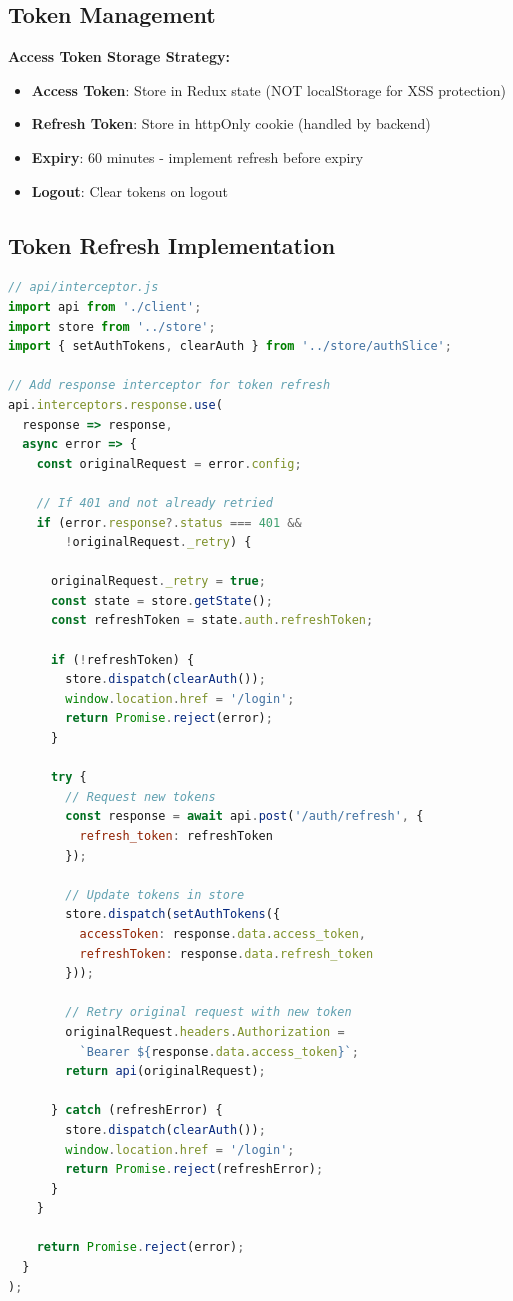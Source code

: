 \documentclass[12pt,a4paper,oneside]{article}
\begin{document}
\subsection{Token Management}

\textbf{Access Token Storage Strategy:}

\begin{itemize}
    \item \textbf{Access Token}: Store in Redux state (NOT localStorage for XSS protection)
    \item \textbf{Refresh Token}: Store in httpOnly cookie (handled by backend)
    \item \textbf{Expiry}: 60 minutes - implement refresh before expiry
    \item \textbf{Logout}: Clear tokens on logout
\end{itemize}

\subsection{Token Refresh Implementation}

\begin{lstlisting}[language=javascript]
// api/interceptor.js
import api from './client';
import store from '../store';
import { setAuthTokens, clearAuth } from '../store/authSlice';

// Add response interceptor for token refresh
api.interceptors.response.use(
  response => response,
  async error => {
    const originalRequest = error.config;

    // If 401 and not already retried
    if (error.response?.status === 401 && 
        !originalRequest._retry) {
      
      originalRequest._retry = true;
      const state = store.getState();
      const refreshToken = state.auth.refreshToken;

      if (!refreshToken) {
        store.dispatch(clearAuth());
        window.location.href = '/login';
        return Promise.reject(error);
      }

      try {
        // Request new tokens
        const response = await api.post('/auth/refresh', {
          refresh_token: refreshToken
        });

        // Update tokens in store
        store.dispatch(setAuthTokens({
          accessToken: response.data.access_token,
          refreshToken: response.data.refresh_token
        }));

        // Retry original request with new token
        originalRequest.headers.Authorization = 
          `Bearer ${response.data.access_token}`;
        return api(originalRequest);

      } catch (refreshError) {
        store.dispatch(clearAuth());
        window.location.href = '/login';
        return Promise.reject(refreshError);
      }
    }

    return Promise.reject(error);
  }
);
\end{lstlisting}
\end{document}
